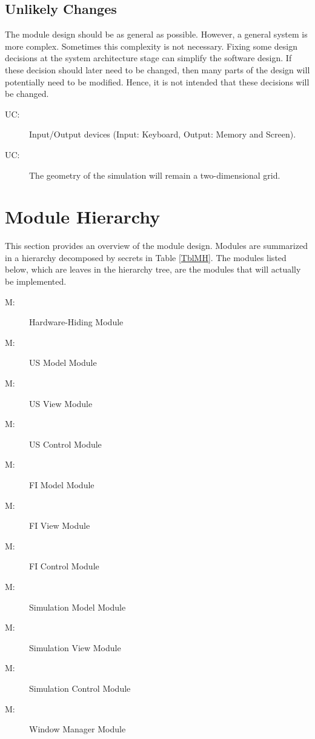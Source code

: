 \documentclass[12pt, titlepage]{article}
\newcounter{ucnum}
\newcommand{\uctheucnum}{UC\theucnum}
\newcounter{mnum}
\newcommand{\mthemnum}{M\themnum}
\begin{document}
\subsection{Unlikely Changes} \label{SecUchange}

The module design should be as general as possible. However, a general system is
more complex. Sometimes this complexity is not necessary. Fixing some design
decisions at the system architecture stage can simplify the software design. If
these decision should later need to be changed, then many parts of the design
will potentially need to be modified. Hence, it is not intended that these
decisions will be changed.

\begin{description}
\item[ \uctheucnum \label{ucIO}:] Input/Output devices
  (Input: Keyboard, Output: Memory and Screen).

\item[ \uctheucnum \label{ucIO}:] The geometry of the simulation will remain a two-dimensional grid.

\end{description}

\section{Module Hierarchy} \label{SecMH}

This section provides an overview of the module design. Modules are summarized
in a hierarchy decomposed by secrets in Table \ref{TblMH}. The modules listed
below, which are leaves in the hierarchy tree, are the modules that will
actually be implemented.

\begin{description}
\item [ \mthemnum \label{mHH}:] Hardware-Hiding Module
\item [ \mthemnum \label{mUM}:] US Model Module
\item [ \mthemnum \label{mUV}:] US View Module
\item [ \mthemnum \label{mUC}:] US Control Module
\item [ \mthemnum \label{mFM}:] FI Model Module
\item [ \mthemnum \label{mFV}:] FI View Module
\item [ \mthemnum \label{mFC}:] FI Control Module
\item [ \mthemnum \label{mSM}:] Simulation Model Module
\item [ \mthemnum \label{mSV}:] Simulation View Module
\item [ \mthemnum \label{mSC}:] Simulation Control Module
\item [ \mthemnum \label{mWM}:] Window Manager Module
\end{description}
\end{document}
